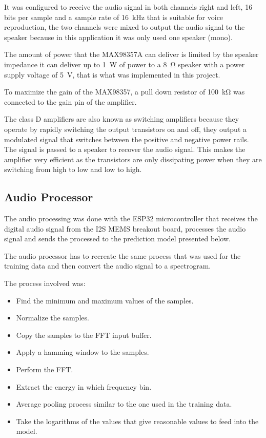 It was configured to receive the audio signal in both channels right and left, 16 bits per sample and a sample rate of \SI{16}{\kilo \hertz} that is suitable for voice reproduction, the two channels were mixed to output the audio signal to the speaker because in this application it was only used one speaker (mono).

The amount of power that the MAX98357A can deliver is limited by the speaker impedance it can deliver up to \SI{1}{\watt} of power to a \SI{8}{\ohm} speaker with a power supply voltage of \SI{5}{\volt}, that is what was implemented in this project.

To maximize the gain of the MAX98357, a pull down resistor of \SI{100}{\kilo \ohm} was connected to the gain pin of the amplifier.

The class D amplifiers are also known as switching amplifiers because they operate by rapidly switching the output transistors on and off, they output a modulated signal that switches between the positive and negative power rails. The signal is passed to a speaker to recover the audio signal. This makes the amplifier very efficient as the transistors are only dissipating power when they are switching from high to low and low to high.

\subsection{Audio Processor}

The audio processing was done with the ESP32 microcontroller that receives the digital audio signal from the I2S MEMS breakout board, processes the audio signal and sends the processed to the prediction model presented below.

The audio processor has to recreate the same process that was used for the training data and then convert the audio signal to a spectrogram.  

The process involved was:
\begin{itemize}
    \item Find the minimum and maximum values of the samples.
    \item Normalize the samples.
    \item Copy the samples to the FFT input buffer.
    \item Apply a hamming window to the samples.
    \item Perform the FFT.
    \item Extract the energy in which frequency bin.
    \item Average pooling process similar to the one used in the training data.
    \item Take the logarithms of the values that give reasonable values to feed into the model.
\end{itemize}

